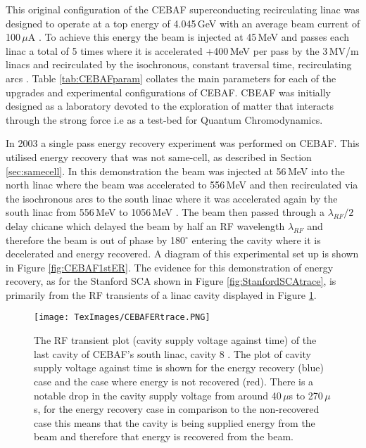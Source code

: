 \documentclass[11pt]{article}
\begin{document}
This original configuration of the CEBAF superconducting recirculating linac was designed to operate at a top energy of 4.045\,GeV with an average beam current of 100\,$\mu$A \cite{CEBAFRLegg}. To achieve this energy the beam is injected at 45\,MeV and passes each linac a total of 5 times where it is accelerated +400\,MeV per pass by the 3\,MV/m linacs and recirculated by the isochronous, constant traversal time, recirculating arcs \cite{CEBAFRLegg}. Table \ref{tab:CEBAFparam} collates the main parameters for each of the upgrades and experimental configurations of CEBAF. CBEAF was initially designed as a laboratory devoted to the exploration of matter that interacts through the strong force \cite{CEBAFGrunder} i.e as a test-bed for Quantum Chromodynamics.

In 2003 a single pass energy recovery experiment was performed on CEBAF. This utilised energy recovery that was not same-cell, as described in Section \ref{sec:samecell}. In this demonstration the beam was injected at 56\,MeV into the north linac where the beam was accelerated to 556\,MeV and then recirculated via the isochronous arcs to the south linac where it was accelerated again by the south linac from 556\,MeV to 1056\,MeV \cite{CEBAF1stER}. The beam then passed through a $\lambda_{RF}/2$ delay chicane which delayed the beam by half an RF wavelength $\lambda_{RF}$ and therefore the beam is out of phase by 180$^{\circ}$ entering the cavity where it is decelerated and energy recovered. A diagram of this experimental set up is shown in Figure \ref{fig:CEBAF1stER}. The evidence for this demonstration of energy recovery, as for the Stanford SCA shown in Figure \ref{fig:StanfordSCAtrace}, is primarily from the RF transients of a linac cavity displayed in Figure \ref{fig:CEBAFERtrace}.

\begin{figure}[H]
\centering
\texttt{[image: TexImages/CEBAFERtrace.PNG]}
\caption{\label{fig:CEBAFERtrace} The RF transient plot (cavity supply voltage against time) of the last cavity of CEBAF's south linac, cavity 8 \cite{CEBAF1stER}. The plot of cavity supply voltage against time is shown for the energy recovery (blue) case and the case where energy is not recovered (red). There is a notable drop in the cavity supply voltage from around 40\,$\mu$s to 270\,$\mu$s, for the energy recovery case in comparison to the non-recovered case this means that the cavity is being supplied energy from the beam and therefore that energy is recovered from the beam.}  
\end{figure}
\end{document}
